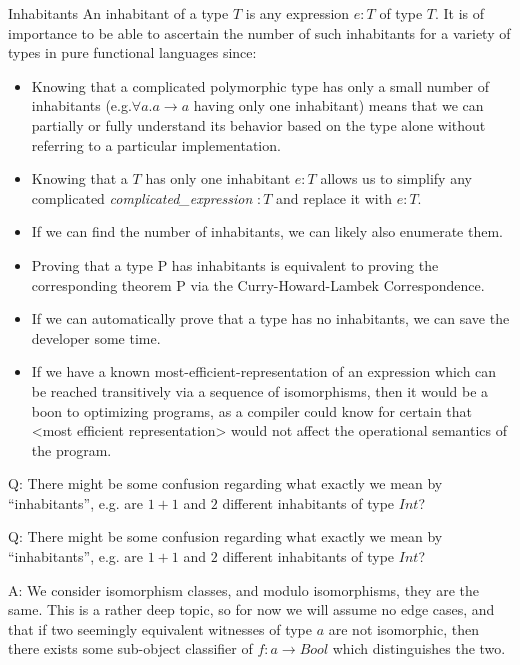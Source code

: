 \documentclass[tikz]{beamer}
\theoremstyle{definition}
\begin{document}
\begin{frame}{Inhabitants}
An inhabitant of a type $T$ is any expression $e : T$ of type $T$. It is of importance to be able to ascertain the number of such inhabitants for a variety of types in pure functional languages since:

\begin{itemize}
	\item Knowing that a complicated polymorphic type has only a small number of inhabitants (e.g.$ \forall a. a \to a$ having only one inhabitant) means that we can partially or fully understand its behavior based on the type alone without referring to a particular implementation.
	\item Knowing that a $T$ has only one inhabitant $e : T$ allows us to simplify any complicated \textit{complicated\_expression} $ : T$ and replace it with $e : T$.
	\item If we can find the number of inhabitants, we can likely also enumerate them.
	\item Proving that a type P has inhabitants is equivalent to proving the corresponding theorem P via the Curry-Howard-Lambek Correspondence.
	\item If we can automatically prove that a type has no inhabitants, we can save the developer some time.
	\item If we have a known most-efficient-representation of an expression which can be reached transitively via a sequence of isomorphisms, then it would be a boon to optimizing programs, as a compiler could know for certain that <most efficient representation> would not affect the operational semantics of the program.
\end{itemize}
\end{frame}
	
\begin{frame}
Q: There might be some confusion regarding what exactly we mean by “inhabitants”, e.g. are $1 + 1$ and $2$ different inhabitants of type $Int$?

\end{frame}

\begin{frame}
Q: There might be some confusion regarding what exactly we mean by “inhabitants”, e.g. are $1 + 1$ and $2$ different inhabitants of type $Int$?

\newline
A: We consider isomorphism classes, and modulo isomorphisms, they are the same. This is a rather deep topic, so for now we will assume no edge cases, and that if two seemingly equivalent witnesses of type $a$ are not isomorphic, then there exists some sub-object classifier of $f: a \to Bool$ which distinguishes the two.
\end{frame}
\end{document}
